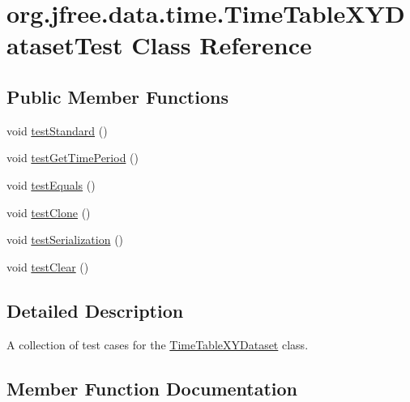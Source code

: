 \hypertarget{classorg_1_1jfree_1_1data_1_1time_1_1_time_table_x_y_dataset_test}{}\section{org.\+jfree.\+data.\+time.\+Time\+Table\+X\+Y\+Dataset\+Test Class Reference}
\label{classorg_1_1jfree_1_1data_1_1time_1_1_time_table_x_y_dataset_test}
\subsection*{Public Member Functions}
\begin{DoxyCompactItemize}
\item 
void \mbox{\hyperlink{classorg_1_1jfree_1_1data_1_1time_1_1_time_table_x_y_dataset_test_a4e58103ea0ce72a2bef33855015aa73e}{test\+Standard}} ()
\item 
void \mbox{\hyperlink{classorg_1_1jfree_1_1data_1_1time_1_1_time_table_x_y_dataset_test_ae9d3fa3cd7a98884ae5676b58b6aa61e}{test\+Get\+Time\+Period}} ()
\item 
void \mbox{\hyperlink{classorg_1_1jfree_1_1data_1_1time_1_1_time_table_x_y_dataset_test_a29f7edf4085699a7860577eb13c9e6d7}{test\+Equals}} ()
\item 
void \mbox{\hyperlink{classorg_1_1jfree_1_1data_1_1time_1_1_time_table_x_y_dataset_test_ae12035dbfe95ff87229bfc53db84ca83}{test\+Clone}} ()
\item 
void \mbox{\hyperlink{classorg_1_1jfree_1_1data_1_1time_1_1_time_table_x_y_dataset_test_a930327ba8553f7e61a55bb80a6988e24}{test\+Serialization}} ()
\item 
void \mbox{\hyperlink{classorg_1_1jfree_1_1data_1_1time_1_1_time_table_x_y_dataset_test_aa03de4d494b452ba680e9ffe35bbe7e3}{test\+Clear}} ()
\end{DoxyCompactItemize}


\subsection{Detailed Description}
A collection of test cases for the \mbox{\hyperlink{classorg_1_1jfree_1_1data_1_1time_1_1_time_table_x_y_dataset}{Time\+Table\+X\+Y\+Dataset}} class. 

\subsection{Member Function Documentation}
\mbox{\label{classorg_1_1jfree_1_1data_1_1time_1_1_time_table_x_y_dataset_test_aa03de4d494b452ba680e9ffe35bbe7e3}} 
